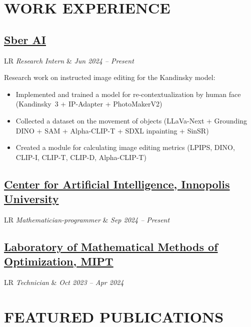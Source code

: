 \documentclass[11pt,a4paper]{moderncv}
\newcommand*{\experienceentry}[4][1.5mm]{
    \subsection{#2} \vspace{-1.5mm}
    \begin{tabularx}{\textwidth}{LR}
        {\itshape #3} & {\itshape #4}
    \end{tabularx}
    \par\addvspace{#1}
}
\begin{document}
\maketitle
\vspace{-3em}

\begin{minipage}[t]{0.62\textwidth}

\section{WORK EXPERIENCE}
\experienceentry{\href{https://ai.sber.ru/en/about}{Sber AI}}{Research Intern}{Jun 2024 -- Present}{
    Research work on instructed image editing for the Kandinsky model:
    \begin{itemize}
        \item Implemented and trained a model for re-contextualization by human face (Kandinsky~3 + IP-Adapter + PhotoMakerV2)
        \item Collected a dataset on the movement of objects (LLaVa-Next + Grounding DINO + SAM + Alpha-CLIP-T + SDXL inpainting + SinSR)
        \item Created a module for calculating image editing metrics (LPIPS, DINO, CLIP-I, CLIP-T, CLIP-D, Alpha-CLIP-T)
    \end{itemize}
}
\experienceentry{\href{https://innopolis.university/en/centerforartificialintelligence/}{Center for Artificial Intelligence, Innopolis University}}{Mathematician-programmer}{Sep 2024 -- Present}
\experienceentry{\href{https://labmmo.ru/en}{Laboratory of Mathematical Methods of Optimization, MIPT}}{Technician}{Oct 2023 -- Apr 2024}

\section{FEATURED PUBLICATIONS}


\end{minipage}
\end{document}

